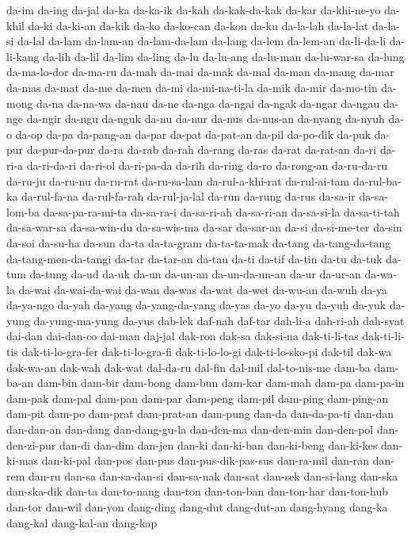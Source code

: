 {da-im da-ing da-jal da-ka da-ka-ik da-kah da-kak-da-kak da-kar
da-khi-ne-yo da-khil da-ki da-ki-an da-kik da-ko da-ko-can da-kon da-ku
da-la-lah da-la-lat da-la-si da-lal da-lam da-lam-an da-lam-da-lam da-lang
da-lem da-lem-an da-li-da-li da-li-kang da-lih da-lil da-lim da-ling da-lu
da-lu-ang da-lu-man da-lu-war-sa da-lung da-ma-lo-dor da-ma-ru da-mah
da-mai da-mak da-mal da-man da-mang da-mar da-mas da-mat da-me da-men
da-mi da-mi-na-ti-la da-mik da-mir da-mo-tin da-mong da-na da-na-wa da-nau
da-ne da-nga da-ngai da-ngak da-ngar da-ngau da-nge da-ngir da-ngu da-nguk
da-nu da-nur da-nus da-nus-an da-nyang da-nyuh da-o da-op da-pa da-pang-an
da-par da-pat da-pat-an da-pil da-po-dik da-puk da-pur da-pur-da-pur da-ra
da-rab da-rah da-rang da-ras da-rat da-rat-an da-ri da-ri-a da-ri-da-ri
da-ri-ol da-ri-pa-da da-rih da-ring da-ro da-rong-an da-ru-da-ru da-ru-ju
da-ru-nu da-ru-rat da-ru-sa-lam da-rul-a-khi-rat da-rul-ai-tam
da-rul-ba-ka da-rul-fa-na da-rul-fa-rah da-rul-ja-lal da-run da-rung
da-rus da-sa-ir da-sa-lom-ba da-sa-pa-ra-mi-ta da-sa-ra-i da-sa-ri-ah
da-sa-ri-an da-sa-si-la da-sa-ti-tah da-sa-war-sa da-sa-win-du
da-sa-wis-ma da-sar da-sar-an da-si da-si-me-ter da-sin da-soi da-su-ha
da-sun da-ta da-ta-gram da-ta-ta-mak da-tang da-tang-da-tang
da-tang-men-da-tangi da-tar da-tar-an da-tau da-ti da-tif da-tin da-tu
da-tuk da-tum da-tung da-ud da-uk da-un da-un-an da-un-da-un-an da-ur
da-ur-an da-wa-la da-wai da-wai-da-wai da-wan da-was da-wat da-wet
da-wu-an da-wuh da-ya da-ya-ngo da-yah da-yang da-yang-da-yang da-yas
da-yo da-yu da-yuh da-yuk da-yung da-yung-ma-yung da-yus dab-lek daf-nah
daf-tar dah-li-a dah-ri-ah dah-syat dai-dan dai-dan-co dai-man daj-jal
dak-ron dak-sa dak-si-na dak-ti-li-tas dak-ti-li-tis dak-ti-lo-gra-fer
dak-ti-lo-gra-fi dak-ti-lo-lo-gi dak-ti-lo-sko-pi dak-til dak-wa dak-wa-an
dak-wah dak-wat dal-da-ru dal-fin dal-mil dal-to-nis-me dam-ba dam-ba-an
dam-bin dam-bir dam-bong dam-bun dam-kar dam-mah dam-pa dam-pa-in dam-pak
dam-pal dam-pan dam-par dam-peng dam-pil dam-ping dam-ping-an dam-pit
dam-po dam-prat dam-prat-an dam-pung dan-da dan-da-pa-ti dan-dan
dan-dan-an dan-dang dan-dang-gu-la dan-den-ma dan-den-min dan-den-pol
dan-den-zi-pur dan-di dan-dim dan-jen dan-ki dan-ki-ban dan-ki-beng
dan-ki-kes dan-ki-mas dan-ki-pal dan-pos dan-pus dan-pus-dik-pas-sus
dan-ra-mil dan-ran dan-rem dan-ru dan-sa dan-sa-dan-si dan-sa-nak dan-sat
dan-sek dan-si-lang dan-ska dan-ska-dik dan-ta dan-to-nang dan-ton
dan-ton-ban dan-ton-har dan-ton-hub dan-tor dan-wil dan-yon dang-ding
dang-dut dang-dut-an dang-hyang dang-ka dang-kal dang-kal-an dang-kap
}
